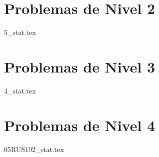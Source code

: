 \section{Problemas de Nivel 2}
{5_stat.tex} %

\section{Problemas de Nivel 3}
{4_stat.tex} %

\section{Problemas de Nivel 4}
{05RUS102_stat.tex} %